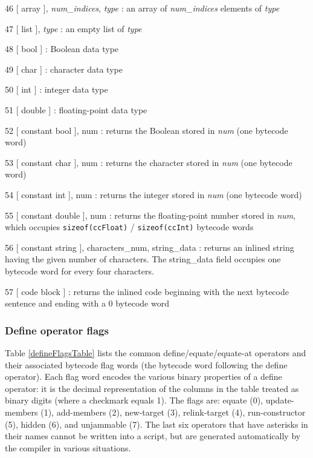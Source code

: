 \documentclass{article}
\begin{document}
\begin{description}
\item{46  [ array ],  \emph{num\_indices}, \emph{type}} : an array of \emph{num\_indices} elements of \emph{type}
\item{47  [ list ],  \emph{type}} : an empty list of \emph{type}
\item{48  [ bool ]} : Boolean data type
\item{49  [ char ]} : character data type
\item{50  [ int ]} : integer data type
\item{51  [ double ]} : floating-point data type

\item{52  [ constant bool ], num} : returns the Boolean stored in \emph{num} (one bytecode word)
\item{53  [ constant char ], num} : returns the character stored in \emph{num} (one bytecode word)
\item{54  [ constant int ], num} : returns the integer stored in \emph{num} (one bytecode word)
\item{55  [ constant double ], num} : returns the floating-point number stored in \emph{num}, which occupies \verb#sizeof(ccFloat)# / \verb#sizeof(ccInt)# bytecode words
\item{56  [ constant string ], characters\_num, string\_data} : returns an inlined string having the given number of characters.  The string\_data field occupies one bytecode word for every four characters.
\item{57  [ code block ]} : returns the inlined code beginning with the next bytecode sentence and ending with a 0 bytecode word


\end{description}





\subsubsection{Define operator flags} 


Table \ref{defineFlagsTable} lists the common define/equate/equate-at operators and their associated bytecode flag words (the bytecode word following the define operator).  Each flag word encodes the various binary properties of a define operator:  it is the decimal representation of the columns in the table treated as binary digits (where a checkmark equals 1).  The flags are:  equate (0), update-members (1), add-members (2), new-target (3), relink-target (4), run-constructor (5), hidden (6), and unjammable (7).  The last six operators that have asterisks in their names cannot be written into a script, but are generated automatically by the compiler in various situations.\\
\end{document}
